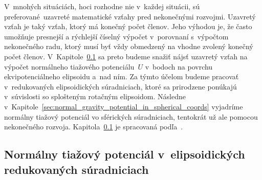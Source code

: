 \documentclass[a4paper,12pt]{book}
\begin{document}
V~mnohých situáciách, hoci rozhodne nie v~každej situácii, sú 
preferované~uzavreté matematické vzťahy pred nekonečnými rozvojmi.  Uzavretý 
vzťah je taký vzťah, ktorý má konečný počet členov.  Jeho výhodou je, že často 
umožňuje presnejší a rýchlejší číselný výpočet v~porovnaní s~výpočtom 
nekonečného radu, ktorý musí byť vždy obmedzený na vhodne zvolený konečný počet 
členov.  V~Kapitole~\ref{sec:normal_gravity_potential_in_reduced_ell_coords} sa 
preto budeme snažiť nájsť uzavretý vzťah na výpočet normálneho tiažového 
potenciálu~$U$ v~bodoch na povrchu ekvipotenciálneho elipsoidu a~nad ním.  Za 
týmto účelom budeme pracovať v~redukovaných elipsoidických súradniciach, ktoré 
sa prirodzene ponúkajú v~súvislosti so splošteným rotačným elipsoidom.  
Následne v~Kapitole~\ref{sec:normal_gravity_potential_in_spherical_coords} 
vyjadríme normálny tiažový potenciál vo sférických súradniciach, tentokrát už 
ale pomocou nekonečného rozvoja.  
Kapitola~\ref{sec:normal_gravity_potential_in_reduced_ell_coords} je spracovaná 
podľa~\textcite{MoritzTheFigureOfTheEarth}.



\subsection{Normálny tiažový potenciál v~elipsoidických redukovaných 
súradniciach}
\label{sec:normal_gravity_potential_in_reduced_ell_coords}
\end{document}
